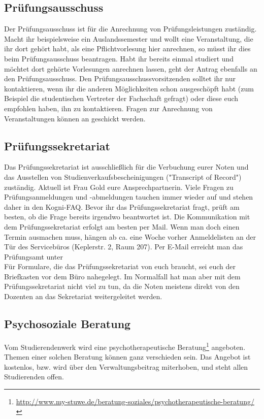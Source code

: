 \subsection*{Prüfungsausschuss} 
Der Prüfungsausschuss ist für die Anrechnung von Prüfungsleistungen zuständig. Macht ihr beispielsweise ein Auslandssemester und wollt eine Veranstaltung, die ihr dort gehört habt, als eine Pflichtvorlesung hier anrechnen, so müsst ihr dies beim Prüfungsausschuss beantragen. Habt ihr bereits einmal studiert und möchtet dort gehörte Vorlesungen anrechnen lassen, geht der Antrag ebenfalls an den Prüfungsausschuss. Den Prüfungsausschussvorsitzenden solltet ihr nur kontaktieren, wenn ihr die anderen Möglichkeiten schon ausgeschöpft habt (zum Beispiel die studentischen Vertreter der Fachschaft gefragt) oder diese euch empfohlen haben, ihn zu kontaktieren. Fragen zur Anrechnung von Veranstaltungen können an  geschickt werden.

\subsection*{Prüfungssekretariat}
Das Prüfungssekretariat ist ausschließlich für die Verbuchung eurer Noten und das Ausstellen von Studienverkaufsbescheinigungen ("Transcript of Record") zuständig. Aktuell ist Frau Gold eure Ansprechpartnerin. Viele Fragen zu Prüfungsanmeldungen und -abmeldungen tauchen immer wieder auf und stehen daher in den Kogni-FAQ. Bevor ihr das Prüfungssekretariat fragt, prüft am besten, ob die Frage bereits irgendwo beantwortet ist. Die Kommunikation mit dem Prüfungssekretariat erfolgt am besten per Mail. Wenn man doch einen Termin ausmachen muss, hängen ab ca. eine Woche vorher Anmeldelisten an der Tür des Servicebüros (Keplerstr. 2, Raum 207). Per E-Mail erreicht man das Prüfungsamt unter  \\
Für Formulare, die das Prüfungssekretariat von euch braucht, sei euch der Briefkasten vor dem Büro nahegelegt. Im Normalfall hat man aber mit dem Prüfungssekretariat nicht viel zu tun, da die Noten meistens direkt von den Dozenten an das Sekretariat weitergeleitet werden. 

\subsection*{Psychosoziale Beratung}
Vom Studierendenwerk wird eine psychotherapeutische Beratung\footnote{\url{http://www.my-stuwe.de/beratung-soziales/psychotherapeutische-beratung/}} angeboten. Themen einer solchen Beratung können ganz verschieden sein. Das Angebot ist kostenlos, bzw. wird über den Verwaltungsbeitrag miterhoben, und steht allen Studierenden offen.	%


